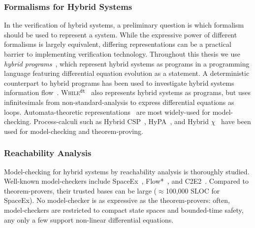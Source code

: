 \documentclass[12pt]{cmuthesis}
\theoremstyle{definition}
\theoremstyle{remark}
\begin{document}
\subsubsection{Formalisms for Hybrid Systems}
In the verification of hybrid systems, a preliminary question is which formalism should be used to represent a system.
While the expressive power of different formalisms is largely equivalent, differing representations can be a practical barrier to implementing verification technology.
Throughout this thesis we use \emph{hybrid programs}~\cite{DBLP:books/sp/Platzer18}, which represent hybrid systems as programs in a programming language featuring differential equation evolution as a statement.
A deterministic counterpart to hybrid programs has been used to investigate hybrid systems information flow~\cite{DBLP:conf/hicons/PrabhakarK13}.
\textsc{While}$^{\texttt{dt}}$~\cite{DBLP:conf/icalp/SuenagaH11} also represents hybrid systems as programs, but uses infinitesimals from non-standard-analysis to express differential equations as loops.
Automata-theoretic representations~\cite{DBLP:conf/lics/Henzinger96} are most widely-used for model-checking.
Process-calculi such as Hybrid CSP~\cite{DBLP:conf/hybrid/ChaochenJR95,DBLP:conf/aplas/LiuLQZZZZ10}, HyPA~\cite{DBLP:journals/jlp/CuijpersR05}, and Hybrid $\chi$~\cite{DBLP:conf/formats/SchiffelersBMRR03} have been used for model-checking and theorem-proving.

\subsubsection{Reachability Analysis}
Model-checking for hybrid systems by reachability analysis is thoroughly studied.
Well-known model-checkers include SpaceEx~\cite{DBLP:conf/cav/FrehseGDCRLRGDM11}, Flow*~\cite{DBLP:conf/cav/ChenAS13}, and C2E2~\cite{DBLP:conf/tacas/DuggiralaMVP15}.
Compared to theorem-provers, their trusted bases can be large (${\approx}$100,000 SLOC for SpaceEx).
No model-checker is as expressive as the theorem-provers: often, model-checkers are restricted to compact state spaces and bounded-time safety, any only a few support non-linear differential equations.
\end{document}
